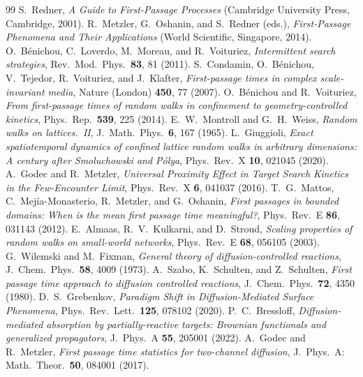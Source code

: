 \documentclass[reprint,amsmath,amssymb,aps,prresearch,longbibliography]{revtex4-2}
\begin{document}
\clearpage
\begin{thebibliography}{99}
 S.~Redner, \emph{A Guide to First-Passage Processes} (Cambridge University Press, Cambridge, 2001).
 R.~Metzler, G.~Oshanin, and S.~Redner (eds.), \emph{First-Passage Phenomena and Their Applications} (World Scientific, Singapore, 2014).
 O.~B\'enichou, C.~Loverdo, M.~Moreau, and R.~Voituriez, \emph{Intermittent search strategies}, Rev.\ Mod.\ Phys.\ \textbf{83}, 81 (2011).
 S.~Condamin, O.~B\'enichou, V.~Tejedor, R.~Voituriez, and J.~Klafter, \emph{First-passage times in complex scale-invariant media}, Nature (London) \textbf{450}, 77 (2007).
 O.~B\'enichou and R.~Voituriez, \emph{From first-passage times of random walks in confinement to geometry-controlled kinetics}, Phys.\ Rep.\ \textbf{539}, 225 (2014).
 E.~W.~Montroll and G.~H.~Weiss, \emph{Random walks on lattices.\ II}, J.\ Math.\ Phys.\ \textbf{6}, 167 (1965).
 L.~Giuggioli, \emph{Exact spatiotemporal dynamics of confined lattice random walks in arbitrary dimensions: A century after Smoluchowski and P\'olya}, Phys.\ Rev.\ X \textbf{10}, 021045 (2020).
 A.~Godec and R.~Metzler, \emph{Universal Proximity Effect in Target Search Kinetics in the Few-Encounter Limit}, Phys.\ Rev.\ X \textbf{6}, 041037 (2016).
 T.~G.~Mattos, C.~Mej\'ia-Monasterio, R.~Metzler, and G.~Oshanin, \emph{First passages in bounded domains: When is the mean first passage time meaningful?}, Phys.\ Rev.\ E \textbf{86}, 031143 (2012).
 E.~Almaas, R.~V.~Kulkarni, and D.~Stroud, \emph{Scaling properties of random walks on small-world networks}, Phys.\ Rev.\ E \textbf{68}, 056105 (2003).
 G.~Wilemski and M.~Fixman, \emph{General theory of diffusion-controlled reactions}, J.\ Chem.\ Phys.\ \textbf{58}, 4009 (1973).
 A.~Szabo, K.~Schulten, and Z.~Schulten, \emph{First passage time approach to diffusion controlled reactions}, J.\ Chem.\ Phys.\ \textbf{72}, 4350 (1980).
 D.~S.~Grebenkov, \emph{Paradigm Shift in Diffusion-Mediated Surface Phenomena}, Phys.\ Rev.\ Lett.\ \textbf{125}, 078102 (2020).
 P.~C.~Bressloff, \emph{Diffusion-mediated absorption by partially-reactive targets: Brownian functionals and generalized propagators}, J.\ Phys.\ A \textbf{55}, 205001 (2022).
 A.~Godec and R.~Metzler, \emph{First passage time statistics for two-channel diffusion}, J.\ Phys.\ A: Math.\ Theor.\ \textbf{50}, 084001 (2017).

\end{thebibliography}
\end{document}
